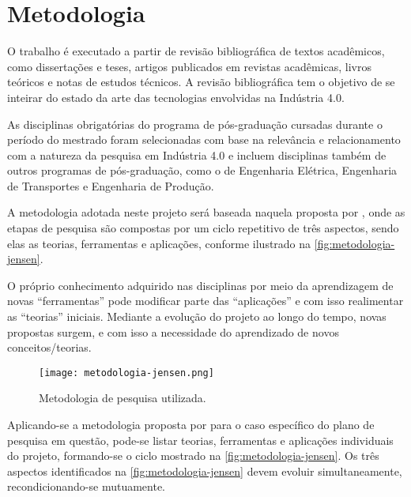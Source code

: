 \chapter{Metodologia}

	O trabalho é executado a partir de revisão bibliográfica de textos acadêmicos, como dissertações e teses, artigos publicados em revistas acadêmicas, livros teóricos e notas de estudos técnicos. A revisão bibliográfica tem o objetivo de se inteirar do estado da arte das tecnologias envolvidas na Indústria 4.0.
	
	As disciplinas obrigatórias do programa de pós-graduação cursadas durante o período do mestrado foram selecionadas com base na relevância e relacionamento com a natureza da pesquisa em Indústria 4.0 e incluem disciplinas também de outros programas de pós-graduação, como o de Engenharia Elétrica, Engenharia de Transportes e Engenharia de Produção.
	
	A metodologia adotada neste projeto será baseada naquela proposta por , onde as etapas de pesquisa são compostas por um ciclo repetitivo de três aspectos, sendo elas as teorias, ferramentas e aplicações, conforme ilustrado na \autoref{fig:metodologia-jensen}.
	
	O próprio conhecimento adquirido nas disciplinas por meio da aprendizagem de novas “ferramentas” pode modificar parte das “aplicações” e com isso realimentar as “teorias” iniciais. Mediante a evolução do projeto ao longo do tempo, novas propostas surgem, e com isso a necessidade do aprendizado de novos conceitos/teorias.

	\begin{figure}[htb]
		\centering
		\caption{Metodologia de pesquisa utilizada.}
		\label{fig:metodologia-jensen}
		\texttt{[image: metodologia-jensen.png]}
	\end{figure}


	Aplicando-se a metodologia proposta por  para o caso específico do plano de pesquisa em questão, pode-se listar teorias, ferramentas e aplicações individuais do projeto, formando-se o ciclo mostrado na \autoref{fig:metodologia-jensen}. Os três aspectos identificados na \autoref{fig:metodologia-jensen} devem evoluir simultaneamente, recondicionando-se mutuamente.

